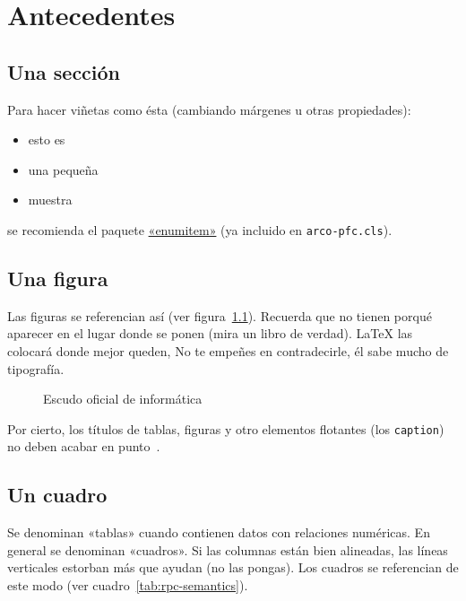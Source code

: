 \chapter{Antecedentes}


\section{Una sección}

Para hacer viñetas como ésta (cambiando márgenes u otras propiedades):

\begin{itemize}[noitemsep, label=$\triangleright$]
\item esto es
\item una pequeña
\item muestra
\end{itemize}

se recomienda el paquete
\href{http://mirror.ctan.org/macros/latex/contrib/enumitem/enumitem.pdf}{«enumitem»}
(ya incluido en \texttt{arco-pfc.cls}).


\section{Una figura}

Las figuras se referencian así (ver figura~\ref{fig:informatica}). Recuerda que
no tienen porqué aparecer en el lugar donde se ponen (mira un libro de
verdad). \LaTeX{} las colocará donde mejor queden, No te empeñes en
contradecirle, él sabe mucho de tipografía.

\begin{figure}[!h]
\begin{center}
\caption{Escudo oficial de informática}
\label{fig:informatica}
\end{center}
\end{figure}

Por cierto, los títulos de tablas, figuras y otro elementos flotantes (los
\texttt{caption}) no deben acabar en punto~\cite{sousa}.


\section{Un cuadro}
\label{sec:uncuadro}

Se denominan «tablas» cuando contienen datos con relaciones numéricas. En
general se denominan «cuadros». Si las columnas están bien alineadas, las líneas
verticales estorban más que ayudan (no las pongas). Los cuadros se referencian
de este modo (ver cuadro~\ref{tab:rpc-semantics}).

